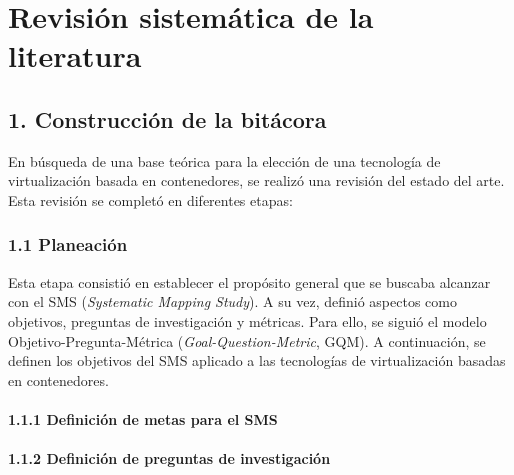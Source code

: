 \chapter*{Revisión sistemática de la literatura}
\label{cap:revisionLiteratura}

\section*{1. Construcción de la bitácora}
\label{sec:bitacora}

En búsqueda de una base teórica para la elección de una tecnología de virtualización basada en contenedores, 
se realizó una revisión del estado del arte. Esta revisión se completó en diferentes etapas:

\subsection*{1.1 Planeación}
\label{subsec:planeacion}

Esta etapa consistió en establecer el propósito general que se buscaba alcanzar con el SMS (\textit{Systematic Mapping Study}). 
A su vez, definió aspectos como objetivos, preguntas de investigación y métricas. Para ello, se siguió el modelo 
Objetivo-Pregunta-Métrica (\textit{Goal-Question-Metric}, GQM). A continuación, se definen los objetivos del SMS aplicado 
a las tecnologías de virtualización basadas en contenedores.

\subsubsection*{1.1.1 Definición de metas para el SMS}
\label{subsubsec:metasSMS}



\subsubsection*{1.1.2 Definición de preguntas de investigación}
\label{subsubsec:preguntasInvestigacion}



